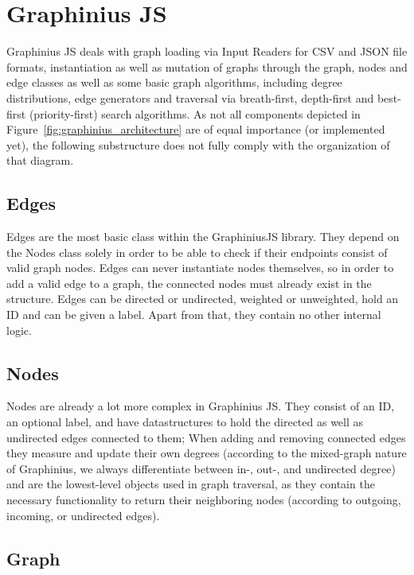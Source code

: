 \section{Graphinius JS}
\label{sect:graphinius_js}

	Graphinius JS deals with graph loading via Input Readers for CSV and JSON file formats, instantiation as well as mutation of graphs through the graph, nodes and edge classes as well as some basic graph algorithms, including degree distributions, edge generators and traversal via breath-first, depth-first and best-first (priority-first) search algorithms. As not all components depicted in Figure~\ref{fig:graphinius_architecture} are of equal importance (or implemented yet), the following substructure does not fully comply with the organization of that diagram.
		
	\subsection{Edges}
	\label{ssection: core_edges}
	
	Edges are the most basic class within the GraphiniusJS library. They depend on the Nodes class solely in order to be able to check if their endpoints consist of valid graph nodes. Edges can never instantiate nodes themselves, so in order to add a valid edge to a graph, the connected nodes must already exist in the structure. Edges can be directed or undirected, weighted or unweighted, hold an ID and can be given a label. Apart from that, they contain no other internal logic.
	
	\subsection{Nodes}
	\label{ssection: core_nodes}
	
	Nodes are already a lot more complex in Graphinius JS. They consist of an ID, an optional label, and have datastructures to hold the directed as well as undirected edges connected to them; When adding and removing connected edges they measure and update their own degrees (according to the mixed-graph nature of Graphinius, we always differentiate between in-, out-, and undirected degree) and are the lowest-level objects used in graph traversal, as they contain the necessary functionality to return their neighboring nodes (according to outgoing, incoming, or undirected edges).
	
	\subsection{Graph}
	\label{ssection: core_graph}
	
